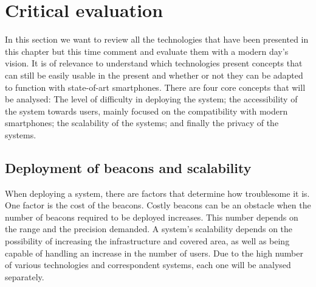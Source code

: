 \section{Critical evaluation} 
\label{sec:critical} 
 

In this section we want to review all the technologies that have been presented in this chapter but this time comment and evaluate them with a modern day's vision. It is of relevance to understand which technologies present concepts that can still be easily usable in the present and whether or not they can be adapted to function with state-of-art smartphones. There are four core concepts that will be analysed: The level of difficulty in deploying the system; the accessibility of the system towards users, mainly focused on the compatibility with modern smartphones; the scalability of the systems; and finally the privacy of the systems. 
 
 
\subsection{Deployment of beacons and scalability} 
\label{subsec:dep} 
 
 
When deploying a system, there are factors that determine how troublesome it is. One factor is the cost of the beacons. Costly beacons can be an obstacle when the number of beacons required to be deployed increases. This number depends on the range and the precision demanded. 
A system's scalability depends on the possibility of increasing the infrastructure and covered area, as well as being capable of handling an increase in the number of users.  
Due to the high number of various technologies and correspondent systems, each one will be analysed separately. 
 
